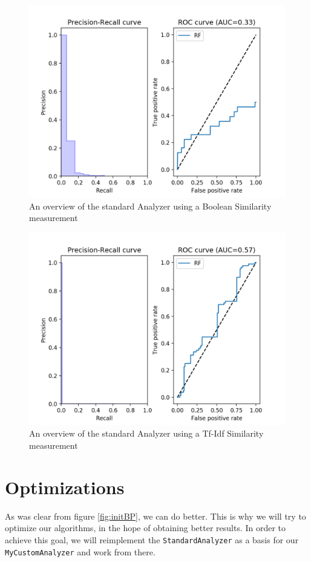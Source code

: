 \documentclass[11pt]{article}
\begin{document}
\begin{figure}[htp]
	\centering
	\includegraphics[width=\textwidth]{images/Boolean-Standard}
	\caption{An overview of the standard Analyzer using a Boolean Similarity measurement}
	\label{fig:bool}
\end{figure}
\begin{figure}[htp]
	\centering
	\includegraphics[width=\textwidth]{images/Tfidf-standard}
	\caption{An overview of the standard Analyzer using a Tf-Idf Similarity measurement}
	\label{fig:tfidf}
\end{figure}

\section{Optimizations}\label{sec:optimizations}
As was clear from figure \ref{fig:initBP}, we can do better. This is why we will try to optimize our algorithms, in the hope of obtaining better results. In order to achieve this goal, we will reimplement the \texttt{StandardAnalyzer} as a basis for our \texttt{MyCustomAnalyzer} and work from there.
\end{document}
